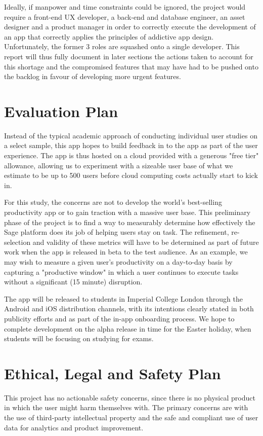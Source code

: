 Ideally, if manpower and time constraints could be ignored, the project would require a front-end UX developer, a back-end and database engineer, an asset designer and a product manager in order to correctly execute the development of an app that correctly applies the principles of addictive app design. Unfortunately, the former 3 roles are squashed onto a single developer. This report will thus fully document in later sections the actions taken to account for this shortage and the compromised features that may have had to be pushed onto the backlog in favour of developing more urgent features.

\section{Evaluation Plan}
Instead of the typical academic approach of conducting individual user studies on a select sample, this app hopes to build feedback in to the app as part of the user experience. The app is thus hosted on a cloud provided with a generous "free tier" allowance, allowing us to experiment with a sizeable user base of what we estimate to be up to 500 users before cloud computing costs actually start to kick in.

For this study, the concerns are not to develop the world's best-selling productivity app or to gain traction with a massive user base. This preliminary phase of the project is to find a way to measurably determine how effectively the Sage platform does its job of helping users stay on task. The refinement, re-selection and validity of these metrics will have to be determined as part of future work when the app is released in beta to the test audience. As an example, we may wish to measure a given user's productivity on a day-to-day basis by capturing a "productive window" in which a user continues to execute tasks without a significant (15 minute) disruption.

The app will be released to students in Imperial College London through the Android and iOS distribution channels, with its intentions clearly stated in both publicity efforts and as part of the in-app onboarding process. We hope to complete development on the alpha release in time for the Easter holiday, when students will be focusing on studying for exams.

\section{Ethical, Legal and Safety Plan}
This project has no actionable safety concerns, since there is no physical product in which the user might harm themselves with. The primary concerns are with the use of third-party intellectual property and the safe and compliant use of user data for analytics and product improvement.

